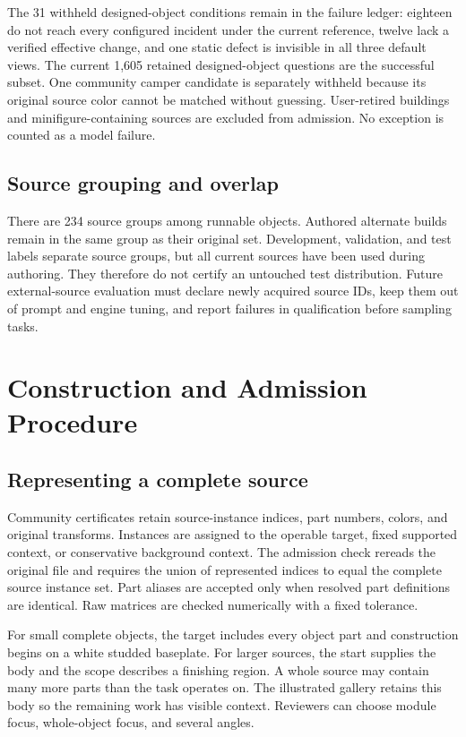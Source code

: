 \documentclass[10pt,twocolumn,letterpaper]{article}
\begin{document}
The 31 withheld designed-object conditions remain in the failure ledger: eighteen do not reach every configured incident under the current reference, twelve lack a verified effective change, and one static defect is invisible in all three default views. The current 1,605 retained designed-object questions are the successful subset. One community camper candidate is separately withheld because its original source color cannot be matched without guessing. User-retired buildings and minifigure-containing sources are excluded from admission. No exception is counted as a model failure.

\subsection{Source grouping and overlap}
There are 234 source groups among runnable objects. Authored alternate builds remain in the same group as their original set. Development, validation, and test labels separate source groups, but all current sources have been used during authoring. They therefore do not certify an untouched test distribution. Future external-source evaluation must declare newly acquired source IDs, keep them out of prompt and engine tuning, and report failures in qualification before sampling tasks.





\section{Construction and Admission Procedure}
\subsection{Representing a complete source}
Community certificates retain source-instance indices, part numbers, colors, and original transforms. Instances are assigned to the operable target, fixed supported context, or conservative background context. The admission check rereads the original file and requires the union of represented indices to equal the complete source instance set. Part aliases are accepted only when resolved part definitions are identical. Raw matrices are checked numerically with a fixed tolerance.

For small complete objects, the target includes every object part and construction begins on a white studded baseplate. For larger sources, the start supplies the body and the scope describes a finishing region. A whole source may contain many more parts than the task operates on. The illustrated gallery retains this body so the remaining work has visible context. Reviewers can choose module focus, whole-object focus, and several angles.
\end{document}
